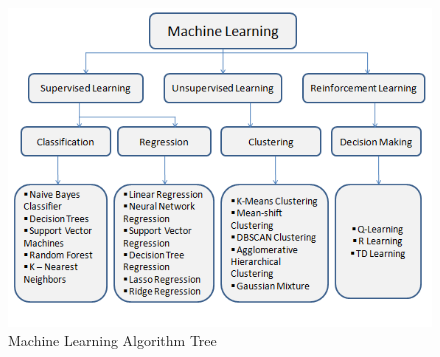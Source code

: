\documentclass[
	number={1},
	title={Machine Learning Fundamentals}
]{cs584notes}
\begin{document}
\begin{figure}[H]
	\centering
	\includegraphics[width=\textwidth]{figures/1/ml_algorithm_tree}
	\caption{Machine Learning Algorithm Tree}
	\label{fig:ml_algorithm_tree}
\end{figure}
\end{document}
